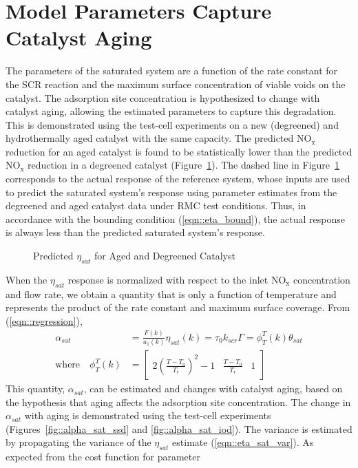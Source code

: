 \documentclass[subscriptcorrection,upint,varvw,barcolor=Goldenrod3,mathalfa=cal=euler,balance,hyphenate,french,pdf-a]{asmejour}
\renewcommand{\bm}[1]{\begin{bmatrix} #1 \end{bmatrix}}
\newcommand{\lr}[1]{\left( #1 \right)}
\newcommand{\figWidth}{0.45\textwidth}
\newcommand{\nox}{\text{NO}_{\text{x}}}
\begin{document}
\section{Model Parameters Capture Catalyst Aging}
The parameters of the saturated system are a function of the rate constant for the SCR reaction and the maximum surface
concentration of viable voids on the catalyst. The adsorption site concentration is hypothesized to change with catalyst aging, allowing the estimated parameters to capture this degradation. This is demonstrated using the test-cell
experiments on a new (degreened) and hydrothermally aged catalyst with the same capacity. The predicted $\nox$
reduction for an aged catalyst is found to be statistically lower than the predicted $\nox$ reduction in a degreened
catalyst (Figure~\ref{fig::aging_diff}). The dashed line in Figure~\ref{fig::aging_diff} corresponds to the actual response of the reference system, whose inputs are used to predict the saturated system's response using parameter estimates from the degreened and aged catalyst data under RMC test conditions. Thus, in accordance with the bounding condition (\ref{eqn::eta_bound}), the actual response is always less than the predicted saturated system's response.
\begin{figure}[ht]
        \centering
        \caption{Predicted $\eta_{sat}$ for Aged and Degreened Catalyst}
        \label{fig::aging_diff}
\end{figure}
When the $\eta_{sat}$ response is normalized with respect to the inlet $\nox$ concentration and flow rate, we obtain
a quantity that is only a function of temperature and represents the product of the rate constant and maximum surface
coverage. From (\ref{eqn::regression}),
\begin{align}
        \alpha_{sat} &= \frac{F(k)}{u_1(k)} \eta_{sat}(k) = \tau_0 k_{scr}\Gamma = \phi_T^T(k)\theta_{sat}\\
        \text{where} \quad \phi_T^T(k) &= \bm{2\lr{\frac{T-T_0}{T_r}}^2-1 & \frac{T-T_0}{T_r} & 1}
\end{align}
This quantity, $\alpha_{sat}$, can be estimated and changes with catalyst aging, based on the hypothesis that aging
affects the adsorption site concentration. The change in $\alpha_{sat}$ with aging is demonstrated using the test-cell
experiments (Figures~\ref{fig::alpha_sat_ssd} and \ref{fig::alpha_sat_iod}). The variance is estimated by propagating
the variance of the $\eta_{sat}$ estimate (\ref{eqn::eta_sat_var}). As expected from the cost function for parameter
\end{document}
